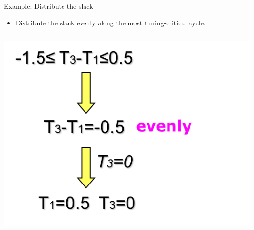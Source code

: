 \documentclass[10pt,ignorenonframetext,mathserif,onlymath]{beamer}
\providecommand{\tightlist}{%
  \setlength{\itemsep}{0pt}\setlength{\parskip}{0pt}}
\begin{document}
\begin{frame}{Example: Distribute the slack}
\protect\hypertarget{example-distribute-the-slack}{}

\begin{itemize}
\tightlist
\item
  Distribute the slack evenly along the most timing-critical cycle.
\end{itemize}

\begin{columns}

\pause
{}

\includegraphics{lec05.files/fig10.png}\\
\end{columns}

\end{frame}
\end{document}
